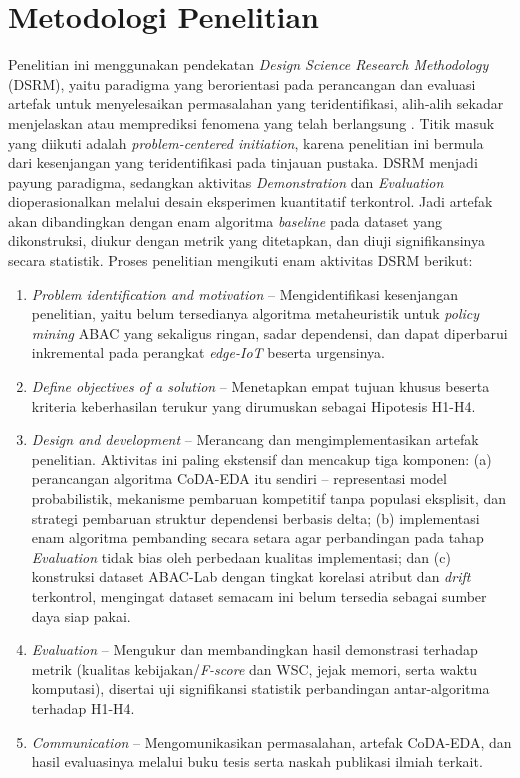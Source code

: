 \section{Metodologi Penelitian}

Penelitian ini menggunakan pendekatan \textit{Design Science Research Methodology} (DSRM)\label{first:dsrm}, yaitu paradigma yang berorientasi pada perancangan dan evaluasi artefak untuk menyelesaikan permasalahan yang teridentifikasi, alih-alih sekadar menjelaskan atau memprediksi fenomena yang telah berlangsung \parencite{peffers_design_2007}.
Titik masuk yang diikuti adalah \textit{problem-centered initiation}, karena penelitian ini bermula dari kesenjangan yang teridentifikasi pada tinjauan pustaka.
DSRM menjadi payung paradigma, sedangkan aktivitas \textit{Demonstration} dan \textit{Evaluation} dioperasionalkan melalui desain eksperimen kuantitatif terkontrol.
Jadi artefak akan dibandingkan dengan enam algoritma \textit{baseline} pada dataset yang dikonstruksi, diukur dengan metrik yang ditetapkan, dan diuji signifikansinya secara statistik.
Proses penelitian mengikuti enam aktivitas DSRM \parencite{peffers_design_2007} berikut:

\begin{enumerate}
    \item \textit{Problem identification and motivation} -- Mengidentifikasi kesenjangan penelitian, yaitu belum tersedianya algoritma metaheuristik untuk \textit{policy mining} ABAC yang sekaligus ringan, sadar dependensi, dan dapat diperbarui inkremental pada perangkat \textit{edge-IoT} beserta urgensinya.
    \item \textit{Define objectives of a solution} -- Menetapkan empat tujuan khusus beserta kriteria keberhasilan terukur yang dirumuskan sebagai Hipotesis H1-H4.
    \item \textit{Design and development} -- Merancang dan mengimplementasikan artefak penelitian. Aktivitas ini paling ekstensif dan mencakup tiga komponen: (a) perancangan algoritma CoDA-EDA itu sendiri -- representasi model probabilistik, mekanisme pembaruan kompetitif tanpa populasi eksplisit, dan strategi pembaruan struktur dependensi berbasis delta; (b) implementasi enam algoritma pembanding secara setara agar perbandingan pada tahap \textit{Evaluation} tidak bias oleh perbedaan kualitas implementasi; dan (c) konstruksi dataset ABAC-Lab dengan tingkat korelasi atribut dan \textit{drift} terkontrol, mengingat dataset semacam ini belum tersedia sebagai sumber daya siap pakai.
    \item \textit{Evaluation} -- Mengukur dan membandingkan hasil demonstrasi terhadap metrik (kualitas kebijakan/\textit{F-score} dan WSC\label{first:wsc}, jejak memori, serta waktu komputasi), disertai uji signifikansi statistik perbandingan antar-algoritma terhadap H1-H4.
    \item \textit{Communication} -- Mengomunikasikan permasalahan, artefak CoDA-EDA, dan hasil evaluasinya melalui buku tesis serta naskah publikasi ilmiah terkait.
\end{enumerate}

